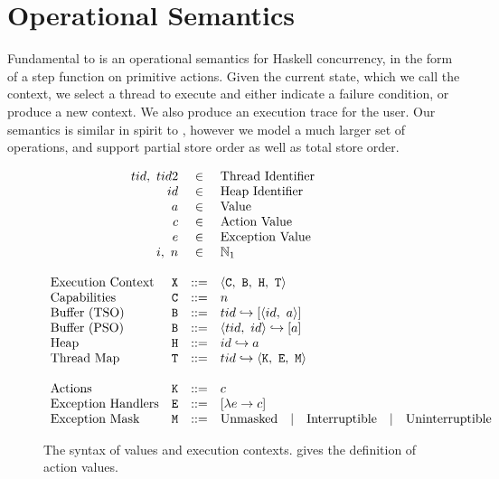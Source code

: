 \section{Operational Semantics}
\label{sec:dejafu-semantics}

Fundamental to \dejafu{} is an operational semantics for Haskell
concurrency, in the form of a step function on primitive actions.
Given the current state, which we call the context, we select a thread
to execute and either indicate a failure condition, or produce a new
context.  We also produce an execution trace for the user.  Our
semantics is similar in spirit to \cite{vollmer2017}, however we model
a much larger set of operations, and support partial store order as
well as total store order.

\newcommand{\bnfeq}{\text{::=}}
\newcommand{\bnfor}{\quad\text{|}\quad}

\begin{figure}
\centering
\[
\begin{array}{lrcl}
  \multicolumn{2}{r}{tid,~tid2} &\in&\text{Thread Identifier}\\
  \multicolumn{2}{r}{id}        &\in&\text{Heap Identifier}\\
  \multicolumn{2}{r}{a}         &\in&\text{Value}\\
  \multicolumn{2}{r}{c}         &\in&\text{Action Value}\\
  \multicolumn{2}{r}{e}         &\in&\text{Exception Value}\\
  \multicolumn{2}{r}{i,~n}      &\in&\mathbb{N}_{1}\\\\
%
  \text{Execution Context}  &\texttt{X}&\bnfeq&\langle \texttt{C},~\texttt{B},~\texttt{H},~\texttt{T} \rangle\\
  \text{Capabilities}       &\texttt{C}&\bnfeq&n\\
  \text{Buffer (TSO)}       &\texttt{B}&\bnfeq&tid \hookrightarrow [\langle id,~a \rangle]\\
  \text{Buffer (PSO)}       &\texttt{B}&\bnfeq&\langle tid,~id \rangle \hookrightarrow [a]\\
  \text{Heap}               &\texttt{H}&\bnfeq&id \hookrightarrow a\\
  \text{Thread Map}         &\texttt{T}&\bnfeq&tid \hookrightarrow \langle \texttt{K},~\texttt{E},~\texttt{M} \rangle\\\\
%
  \text{Actions}            &\texttt{K}&\bnfeq&c\\
  \text{Exception Handlers} &\texttt{E}&\bnfeq&[\lambda e \rightarrow c]\\
  \text{Exception Mask}     &\texttt{M}&\bnfeq&\text{Unmasked} \bnfor \text{Interruptible} \bnfor \text{Uninterruptible}\\
\end{array}
\]
\caption[The syntax of values and execution contexts.]{The syntax of values and execution contexts.   gives the definition of action values.}\label{fig:opsyntax}
\end{figure}

